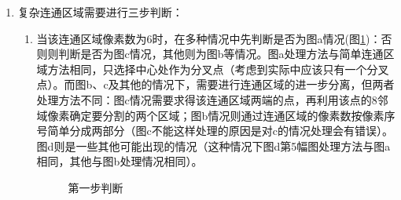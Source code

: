 \documentclass[12pt]{article}
\begin{document}
\begin{enumerate}
\begin{enumerate}
\item 复杂连通区域需要进行三步判断：
\begin{enumerate}
\item 当该连通区域像素数为6时，在多种情况中先判断是否为图a情况(图\ref{fig:complex1})：否则则判断是否为图c情况，其他则为图b等情况。图a处理方法与简单连通区域方法相同，只选择中心处作为分叉点（考虑到实际中应该只有一个分叉点）。而图b、c及其他的情况下，需要进行连通区域的进一步分离，但两者处理方法不同：图c情况需要求得该连通区域两端的点，再利用该点的8邻域像素确定要分割的两个区域；图b情况则通过连通区域的像素数按像素序号简单分成两部分（图c不能这样处理的原因是对c的情况处理会有错误）。图d则是一些其他可能出现的情况（这种情况下图d第5幅图处理方法与图a相同，其他与图b处理情况相同）。
\begin{figure}[ht]
\centering
{}
\hspace{0.3in}
\hspace{0.3in}
\caption{第一步判断}
\label{fig:complex1}
\end{figure}


\end{enumerate}
\end{enumerate}
\end{enumerate}
\end{document}
